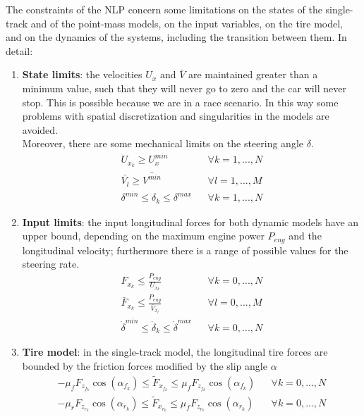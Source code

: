 \documentclass[a4paper, onecolumn, 12pt]{article}
\begin{document}
The constraints of the NLP concern some limitations on the states of the single-track and of the point-mass models, 
on the input variables, on the tire model, and on the dynamics of the systems, including the transition between
them. In detail:
\begin{enumerate}
    \item \textbf{State limits}: the velocities $U_x$ and $\bar{V}$ are maintained greater than a minimum value, such 
    that they will never go to zero and the car will never stop. This is possible because we are in a race scenario.
    In this way some problems with spatial discretization and singularities in the models are avoided.\\
    Moreover, there are some mechanical limits on the steering angle $\delta$.
    \begin{align}
        U_{x_k} \geq U_x^{min} && \forall k=1,...,N\\
        \bar{V_l} \geq \bar{V^{min}} && \forall l=1,...,M\\
        \delta^{min} \leq \delta_k \leq \delta^{max} && \forall k=1,...,N
    \end{align}

    \item \textbf{Input limits}: the input longitudinal forces for both dynamic models have an upper bound, depending
    on the maximum engine power $P_{eng}$ and the longitudinal velocity; furthermore there is a range of possible values
    for the steering rate.
    \begin{align}
        F_{x_k} \leq \frac{P_{eng}}{U_{x_k}} && \forall k=0,...,N \\
        \bar{F}_{x_k} \leq \frac{P_{eng}}{\bar{V}_{x_l}} && \forall l=0,...,M \\
        \dot{\delta}^{min} \leq \dot{\delta}_{k} \leq \dot{\delta}^{max} && \forall k=0,...,N
    \end{align}

    \item \textbf{Tire model}: in the single-track model, the longitudinal tire forces are bounded by the friction forces 
    modified by the slip angle $\alpha$
    \begin{align}
        -\mu_f F_{z_{f_k}} \cos(\alpha_{f_k}) \leq \tilde{F}_{x_{f_k}} \leq \mu_f F_{z_{f_k}} \cos(\alpha_{f_k}) && \forall k=0,...,N \\
        -\mu_r F_{z_{r_k}} \cos(\alpha_{r_k}) \leq \tilde{F}_{x_{r_k}} \leq \mu_f F_{z_{r_k}} \cos(\alpha_{r_k}) && \forall k=0,...,N 
    \end{align}


\end{enumerate}
\end{document}
